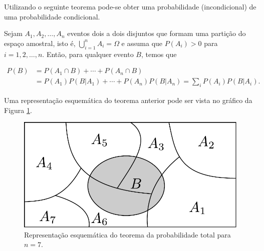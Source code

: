 \begin{frame}
Utilizando o seguinte teorema pode-se obter uma probabilidade (incondicional) de uma
probabilidade condicional.
\begin{teo} 
	\label{teoBayes}
	Sejam $A_1, A_2, \ldots, A_n$ eventos dois a dois disjuntos que formam uma partição do espaço amostral, isto é, $ \displaystyle \bigcup_{i=1}^nA_i=\Omega $ e assuma que $P(A_i) > 0$  para $i = 1, 2, \ldots, n.$ Então, para qualquer evento $B$, temos que
	
	\[
	\begin{aligned}
	P(B)&=P(A_1\cap B) + \cdots + P( A_n \cap B) \\ &= P(A_1) P(B|A_1) + \cdots + P(A_n)P(B|A_n)= \displaystyle \sum_{i}P(A_i)P(B|A_i).
	\end{aligned}
	\] 	
\end{teo}
Uma representação esquemática do teorema anterior pode ser vista no gráfico da Figura \ref{fig5}.
\begin{figure}[!htb]
	\begin{center}
		\includegraphics[angle=0, scale=0.3]{fig5.pdf}
	\end{center}
	\caption{\label{fig5} Representação esquemática do teorema da probabilidade total para $n=7$.}
\end{figure} 

\end{frame}


